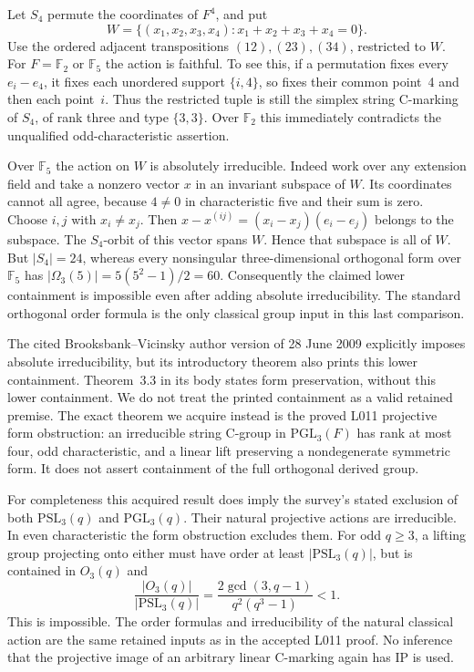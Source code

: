 \documentclass[11pt,a4paper]{article}
\begin{document}
Let $S_4$ permute the coordinates of $F^4$, and put
\[
 W=\{(x_1,x_2,x_3,x_4):x_1+x_2+x_3+x_4=0\}.
\]
Use the ordered adjacent transpositions $(12),(23),(34)$, restricted to $W$.
For $F=\mathbb F_2$ or $\mathbb F_5$ the action is faithful. To see this,
if a permutation fixes every $e_i-e_4$, it fixes each unordered support
$\{i,4\}$, so fixes their common point~4 and then each point~$i$.
Thus the restricted tuple is still the simplex string C-marking of $S_4$,
of rank three and type $\{3,3\}$. Over $\mathbb F_2$ this immediately
contradicts the unqualified odd-characteristic assertion.

Over $\mathbb F_5$ the action on $W$ is absolutely irreducible. Indeed work
over any extension field and take a nonzero vector $x$ in an invariant
subspace of $W$. Its coordinates cannot all agree, because $4\ne0$ in
characteristic five and their sum is zero. Choose $i,j$ with $x_i\ne x_j$.
Then $x-x^{(ij)}=(x_i-x_j)(e_i-e_j)$ belongs to the subspace. The $S_4$-orbit
of this vector spans $W$. Hence that subspace is all of $W$.
But $|S_4|=24$, whereas every nonsingular three-dimensional orthogonal
form over $\mathbb F_5$ has $|\Omega_3(5)|=5(5^2-1)/2=60$.
Consequently the claimed lower containment is impossible even after adding
absolute irreducibility. The standard orthogonal order formula is the only
classical group input in this last comparison.

The cited Brooksbank--Vicinsky author version of 28 June 2009 explicitly
imposes absolute irreducibility, but its introductory theorem also prints
this lower containment. Theorem~3.3 in its body states form preservation,
without this lower containment.
We do not treat the printed containment as a valid retained premise.
The exact theorem we acquire instead is the proved L011 projective form
obstruction: an irreducible string C-group in $\mathrm{PGL}_3(F)$ has rank
at most four, odd characteristic, and a linear lift preserving a nondegenerate
symmetric form. It does not assert containment of the full orthogonal
derived group.

For completeness this acquired result does imply the survey's stated
exclusion of both $\mathrm{PSL}_3(q)$ and $\mathrm{PGL}_3(q)$. Their natural
projective actions are irreducible. In even characteristic the form obstruction
excludes them. For odd $q\ge3$, a lifting group projecting onto either must
have order at least $|\mathrm{PSL}_3(q)|$, but is contained in $O_3(q)$ and
\[
 \frac{|O_3(q)|}{|\mathrm{PSL}_3(q)|}
 =\frac{2\gcd(3,q-1)}{q^2(q^3-1)}<1.
\]
This is impossible. The order formulas and irreducibility of the natural
classical action are the same retained inputs as in the accepted L011 proof.
No inference that the projective image of an arbitrary linear C-marking
again has IP is used.
\end{document}
